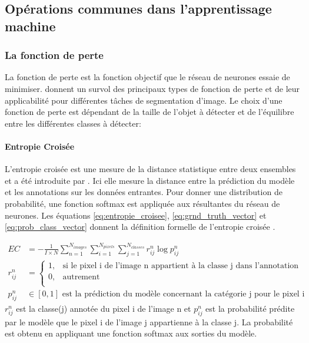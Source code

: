   \subsection{Opérations communes dans l'apprentissage machine}
    \subsubsection{La fonction de perte}
      La fonction de perte est la fonction objectif que le réseau de neurones essaie de minimiser. \textcite{azad_loss_2023, jadon_survey_2020} donnent un survol des principaux types de fonction de perte et de leur applicabilité pour différentes tâches de segmentation d'image. Le choix d'une fonction de perte est dépendant de la taille de l'objet à détecter et de l'équilibre entre les différentes classes à détecter:\par
      \paragraph{Entropie Croisée} L'entropie croisée est une mesure de la distance statistique entre deux ensembles et a été introduite par \textcite{shannon_mathematical_1948}. Ici elle mesure la distance entre la prédiction du modèle et les annotations sur les données entrantes. Pour donner une distribution de probabilité, une fonction softmax est appliquée aux résultantes du réseau de neurones.
      Les équations \ref{eq:entropie_croisee}, \ref{eq:grnd_truth_vector} et \ref{eq:prob_class_vector} donnent la définition formelle de l'entropie croisée \parencite{wallach_deep_2024}.\par
      \begin{align}
        EC & = -\frac{1}{I \times N} \sum_{n=1}^{N_{images}}\sum_{i=1}^{N_{pixels}}\sum_{j=1}^{N_{classes}}r^{n}_{ij} \log{p^{n}_{ij}} \label{eq:entropie_croisee}\\
        r^{n}_{ij} & = \begin{cases}
          1,& \mbox{si le pixel i de l'image n appartient à la classe j dans l'annotation d'entrainement}\\
          0,& \mbox{autrement}\\ \end{cases}\label{eq:grnd_truth_vector}\\
        p^{n}_{ij} & \in [0,1]\mbox{ est la prédiction du modèle concernant la catégorie j pour le pixel i}\label{eq:prob_class_vector}
      \end{align}
      $r^{n}_{ij}$ est la classe(j) annotée du pixel i de l'image n et $p^{n}_{ij}$ est la probabilité prédite par le modèle que le pixel i de l'image j appartienne à la classe j. La probabilité est obtenu en appliquant une fonction softmax aux sorties du modèle. 
